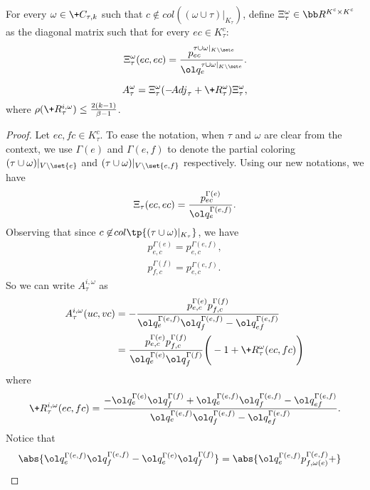 For every $\omega\in\+C_{\tau,k}$ such that $c\not\in \!{col}((\omega\cup\tau)|_{K_\tau})$,
define $\Xi_\tau^{\omega} \in \bb R^{K^c\times K^c}$ as the diagonal matrix such that for every $ec \in K_\tau^{c}$:
\[
	\Xi_\tau^{\omega}(ec,ec) =
    \frac{p^{\tau\cup\omega|_{K\setminus \set e}}_{ec}}
         {\ol q^{\tau\cup\omega|_{K\setminus \set e}}_e}.
\]
\begin{lemma}\label{lem:A-tau-i-omega}
	\[
	A_\tau^{\omega} = \Xi_\tau^{\omega} (-\!{Adj}_\tau + \+R_\tau^{\omega}) \Xi_{\tau}^{\omega} ,
	\]
	where $\rho(\+R_\tau^{i,\omega}) \le  \frac{2(k-1)}{\beta - 1}$.
\end{lemma}
\begin{proof}
	Let $ec,fc\in K_\tau^{c}$.
    To ease the notation, when $\tau$ and $\omega$ are clear from the context,
    we use $\Gamma(e)$ and $\Gamma(e,f)$ to denote the partial coloring $(\tau\cup\omega)|_{V\setminus\set{e}}$ and $(\tau\cup\omega)|_{V\setminus\set{e,f}}$ respectively.
	Using our new notations, we have
	\[
	\Xi_\tau(ec,ec) =
    \frac{p^{\Gamma(e)}_{ec}}
         {\ol q^{\Gamma(e, f)}_e}.
	\]
	Observing that since $c\not\in\!{col}\tp{(\tau\cup \omega)|_{K_\tau}}$, we have
	\begin{align*}
        p^{\Gamma(e)}_{e, c} = p^{\Gamma(e, f)}_{e, c},
      \\p^{\Gamma(f)}_{f, c} = p^{\Gamma(e, f)}_{e, c}.
	\end{align*}
	So we can write $A_\tau^{i,\omega}$ as
	\begin{align*}
		A_\tau^{i,\omega}(uc,vc)
		&=-\frac{p^{\Gamma(e)}_{e, c}p^{\Gamma(f)}_{f, c}}
        {\ol q^{\Gamma(e,f)}_e \ol q^{\Gamma(e,f)}_f - \ol q^{\Gamma(e,f)}_{ef}}
	  \\&=\frac{p^{\Gamma(e)}_{e, c}p^{\Gamma(f)}_{f, c}}
        {\ol q^{\Gamma(e)}_e \ol q^{\Gamma(f)}_f}
        \Bigg(
        -1 + \+R_\tau^{\omega}(ec,fc) 
        \Bigg)
	\end{align*}
	where 
	\begin{equation}\label{eqn:eta-remain}
		\+R_\tau^{i,\omega}(ec,fc) =
        \frac{
        -{\ol q^{\Gamma(e)}_e \ol q^{\Gamma(f)}_f}
        +
        {\ol q^{\Gamma(e,f)}_e \ol q^{\Gamma(e,f)}_f - \ol q^{\Gamma(e,f)}_{ef}}
        }{
        {\ol q^{\Gamma(e,f)}_e \ol q^{\Gamma(e,f)}_f - \ol q^{\Gamma(e,f)}_{ef}}
        }.
	\end{equation}
    Notice that
    \begin{align*}
    \abs{\ol q^{\Gamma(e,f)}_e \ol q^{\Gamma(e,f)}_f - \ol q^{\Gamma(e)}_e \ol q^{\Gamma(f)}_f}
    &=
    \abs{\ol q^{\Gamma(e,f)}_e p^{\Gamma(e, f)}_{f, \omega(e)} +
}
\end{align*}
\end{proof}
